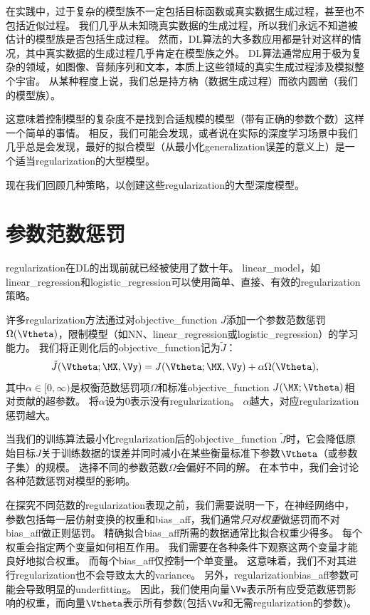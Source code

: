 在实践中，过于复杂的模型族不一定包括目标函数或真实数据生成过程，甚至也不包括近似过程。
我们几乎从未知晓真实数据的生成过程，所以我们永远不知道被估计的模型族是否包括生成过程。
然而，\gls{DL}算法的大多数应用都是针对这样的情况，其中真实数据的生成过程几乎肯定在模型族之外。
\gls{DL}算法通常应用于极为复杂的领域，如图像、音频序列和文本，本质上这些领域的真实生成过程涉及模拟整个宇宙。
从某种程度上说，我们总是持方枘（数据生成过程）而欲内圆凿（我们的模型族）。

这意味着控制模型的复杂度不是找到合适规模的模型（带有正确的参数个数）这样一个简单的事情。
相反，我们可能会发现，或者说在实际的深度学习场景中我们几乎总是会发现，最好的拟合模型（从最小化\gls{generalization}误差的意义上）是一个适当\gls{regularization}的大型模型。

现在我们回顾几种策略，以创建这些\gls{regularization}的大型深度模型。


\section{参数范数惩罚}
\label{sec:parameter_norm_penalties}
\gls{regularization}在\gls{DL}的出现前就已经被使用了数十年。
\gls{linear_model}，如\gls{linear_regression}和\gls{logistic_regression}可以使用简单、直接、有效的\gls{regularization}策略。

许多\gls{regularization}方法通过对\gls{objective_function} $J$添加一个参数范数惩罚$\Omega(\Vtheta)$，限制模型（如\gls{NN}、\gls{linear_regression}或\gls{logistic_regression}）的学习能力。
我们将正则化后的\gls{objective_function}记为$\tilde{J}$：
\begin{align}
 \tilde{J}(\Vtheta;\MX, \Vy) = J(\Vtheta;\MX, \Vy) + \alpha \Omega(\Vtheta),
\end{align}
其中$\alpha \in [0, \infty)$是权衡范数惩罚项$\Omega$和标准\gls{objective_function} $J(\MX;\Vtheta)$相对贡献的超参数。
将$\alpha$设为0表示没有\gls{regularization}。
$\alpha$越大，对应\gls{regularization}惩罚越大。

当我们的训练算法最小化\gls{regularization}后的\gls{objective_function} $\tilde{J}$时，它会降低原始目标$J$关于训练数据的误差并同时减小在某些衡量标准下参数$\Vtheta$（或参数子集）的规模。
选择不同的参数范数$\Omega$会偏好不同的解。
在本节中，我们会讨论各种范数惩罚对模型的影响。

在探究不同范数的\gls{regularization}表现之前，我们需要说明一下，在神经网络中，参数包括每一层仿射变换的权重和\gls{bias_aff}，我们通常\emph{只对权重}做惩罚而不对\gls{bias_aff}做正则惩罚。
精确拟合\gls{bias_aff}所需的数据通常比拟合权重少得多。
每个权重会指定两个变量如何相互作用。
我们需要在各种条件下观察这两个变量才能良好地拟合权重。
而每个\gls{bias_aff}仅控制一个单变量。
这意味着，我们不对其进行\gls{regularization}也不会导致太大的\gls{variance}。
另外，\gls{regularization}\gls{bias_aff}参数可能会导致明显的\gls{underfitting}。
因此，我们使用向量$\Vw$表示所有应受范数惩罚影响的权重，而向量$\Vtheta$表示所有参数(包括$\Vw$和无需\gls{regularization}的参数)。

